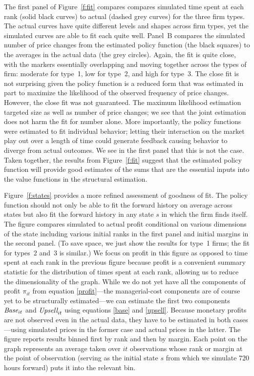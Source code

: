 \documentclass[11pt]{article}
\newcommand{\Base}{\mbox{\it Base}}
\newcommand{\Upsell}{\mbox{\it Upsell}}
\begin{document}
\begin{spacing}{1.3}
The first panel of Figure~\ref{f:fit} compares compares simulated time
spent at each rank (solid black curves) to actual (dashed grey curves)
for the three firm types. The actual curves have quite different
levels and shapes across firm types, yet the simulated curves are able
to fit each quite well. Panel~B compares the simulated number of price
changes from the estimated policy function (the black squares) to the
averages in the actual data (the grey circles). Again, the fit is
quite close, with the markers essentially overlapping and moving
together across the types of firm: moderate for type~1, low for
type~2, and high for type~3. The close fit is not surprising given the
policy function is a reduced form that was estimated in part to
maximize the likelihood of the observed frequency of price
changes. However, the close fit was not guaranteed. The maximum
likelihood estimation targeted size as well as number of price
changes; we see that the joint estimation does not harm the fit for
number alone. More importantly, the policy functions were estimated to
fit individual behavior; letting their interaction on the market play
out over a length of time could generate feedback causing behavior to
diverge from actual outcomes. We see in the first panel that this is
not the case.  Taken together, the results from Figure~\ref{f:fit}
suggest that the estimated policy function will provide good estimates
of the sums that are the essential inputs into the value functions in
the structural estimation.

Figure~\ref{f:states} provides a more refined assessment of goodness
of fit. The policy function should not only be able to fit the forward
history on average across states but also fit the forward history in
any state $s$ in which the firm finds itself. The figure compares
simulated to actual profit conditional on various dimensions of the
state including various initial ranks in the first panel and initial
margins in the second panel. (To save space, we just show the results
for type~1 firms; the fit for types~2 and~3 is similar.)  We focus on
profit in this figure as opposed to time spent at each rank in the
previous figure because profit is a convenient summary statistic for
the distribution of times spent at each rank, allowing us to reduce
the dimensionality of the graph. While we do not yet have all the
components of profit $\pi_{it}$ from equation \eqref{profit}---the
managerial-cost components are of course yet to be structurally
estimated---we can estimate the first two components $\Base_{it}$ and
$\Upsell_{it}$ using equations \eqref{base} and
\eqref{upsell}. Because monetary profits are not observed even in the
actual data, they have to be estimated in both cases---using simulated
prices in the former case and actual prices in the latter. The figure
reports results binned first by rank and then by margin. Each point on
the graph represents an average taken over $it$ observations whose
rank or margin at the point of observation (serving as the initial
state $s$ from which we simulate 720 hours forward) puts it into the
relevant bin.


\end{spacing}
\end{document}
